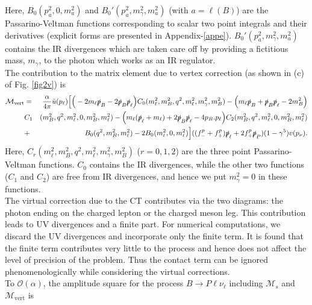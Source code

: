 \documentclass[a4paper,11pt]{article}
\begin{document}
	    	Here, $B_{0}(p_{a}^{2},0,m_{a}^{2})$ and $B_{0}'(p_{a}^{2},m_{\gamma}^{2},m_{a}^{2})$ (with $a=\ell (B)$) are the Passarino-Veltman \cite{Passarino:1978jh} functions corresponding to scalar two point integrals and their derivatives (explicit forms are presented in Appendix-\ref{appe}). $B_{0}'(p_{a}^{2},m_{\gamma}^{2},m_{a}^{2})$ contains the IR divergences which are taken care off by providing a fictitious mass, $m_{\gamma}$, to the photon which works as an IR regulator.\\ 
	        The contribution to the matrix element due to vertex correction (as shown in (c) of Fig. \ref{fig2v}) is
	       {\small 
	    \begin{eqnarray}
	    \mathcal{M}_{\text{vert}} &=&  \frac{\alpha}{4\pi} \bar{u}(p_{\ell})\Big[\Big(-2m_{\ell} \slashed{p}_{B}-2\slashed{p}_{B}\slashed{p}_{\ell}\Big)C_{0}(m_{\ell}^{2},m_{B}^{2},q^{2},m_{\ell}^{2},m_{\gamma}^{2},m_{B}^{2}) - \Big(m_{\ell}\slashed{p}_{B} + \slashed{p}_{B}\slashed{p}_{\ell}-2m_{B}^{2}\Big)\nonumber\\ &C_{1}&(m_{B}^{2},q^{2},m_{\ell}^{2},0,m_{B}^{2},m_{\ell}^{2})-\Big(m_{\ell}(\slashed{p}_{\ell}+m_{\ell})+ 2 \slashed{p}_{B}\slashed{p}_{\ell}-4 p_B.p_{\ell}\Big)C_{2}(m_{B}^{2},q^{2},m_{\ell}^{2},0,m_{B}^{2},m_{\ell}^{2})\nonumber\\ &+& B_{0}(q^{2},m_{B}^{2},m_{\ell}^{2})- 2 B_{0}(m_{\ell}^{2},0,m_{\ell}^{2}) \Big]((f_{-}^{p}+f_{+}^{p})\slashed{p}_{\ell} + 2 f_{+}^{p} \slashed{p}_{P})(1-\gamma^{5}) v(p_{\nu}).
	    \end{eqnarray}}
	    Here, $C_{r}(m_{\ell}^{2},m_{B}^{2},q^{2},m_{\ell}^{2},m_{\gamma}^{2},m_{B}^{2})$ ($r=0,1,2$) are the three point Passarino-Veltman functions. $C_{0}$ contains the IR divergences, while the other two functions ($C_1$ and $C_2$) are free from IR divergences, and hence we put $m_{\gamma}^{2}=0$ in these functions. \\
	    The virtual correction due to the CT contributes via the two diagrams: the photon ending on the charged lepton or the charged meson leg. This contribution leads to UV divergences and a finite part. For numerical computations, we discard the UV divergences and incorporate only the finite term. It is found that the finite term contributes very little to the process and hence does not affect the level of precision of the problem. Thus the contact term can be ignored phenomenologically while considering the virtual corrections. \\
	    	To $\mathcal{O}(\alpha)$, the amplitude square for the process $B\rightarrow P \ell \nu_\ell$ including $\mathcal{M}_s$	and $\mathcal{M}_{\text{vert}}$ is 
\end{document}
